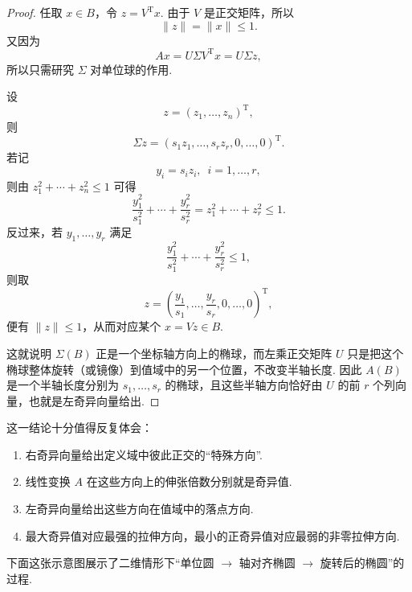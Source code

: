 \begin{proof}
    任取 $ x \in B $，令 $ z = V^{\mathrm{T}}x $. 由于 $ V $ 是正交矩阵，所以
    \[
        \lVert z \rVert = \lVert x \rVert \leqslant 1.
    \]
    又因为
    \[
        Ax = U\Sigma V^{\mathrm{T}}x = U\Sigma z,
    \]
    所以只需研究 $ \Sigma $ 对单位球的作用.

    设
    \[
        z = (z_1, \ldots, z_n)^{\mathrm{T}},
    \]
    则
    \[
        \Sigma z = (s_1z_1, \ldots, s_rz_r, 0, \ldots, 0)^{\mathrm{T}}.
    \]
    若记
    \[
        y_i = s_i z_i,\enspace i = 1, \ldots, r,
    \]
    则由 $ z_1^2 + \cdots + z_n^2 \leqslant 1 $ 可得
    \[
        \frac{y_1^2}{s_1^2} + \cdots + \frac{y_r^2}{s_r^2}
        = z_1^2 + \cdots + z_r^2
        \leqslant 1.
    \]
    反过来，若 $ y_1, \ldots, y_r $ 满足
    \[
        \frac{y_1^2}{s_1^2} + \cdots + \frac{y_r^2}{s_r^2} \leqslant 1,
    \]
    则取
    \[
        z = \left( \frac{y_1}{s_1}, \ldots, \frac{y_r}{s_r}, 0, \ldots, 0 \right)^{\mathrm{T}},
    \]
    便有 $ \lVert z \rVert \leqslant 1 $，从而对应某个 $ x = Vz \in B $.

    这就说明 $ \Sigma(B) $ 正是一个坐标轴方向上的椭球，而左乘正交矩阵 $ U $ 只是把这个椭球整体旋转（或镜像）到值域中的另一个位置，不改变半轴长度. 因此 $ A(B) $ 是一个半轴长度分别为 $ s_1, \ldots, s_r $ 的椭球，且这些半轴方向恰好由 $ U $ 的前 $ r $ 个列向量，也就是左奇异向量给出.
\end{proof}

这一结论十分值得反复体会：
\begin{enumerate}
    \item 右奇异向量给出定义域中彼此正交的“特殊方向”.

    \item 线性变换 $ A $ 在这些方向上的伸张倍数分别就是奇异值.

    \item 左奇异向量给出这些方向在值域中的落点方向.

    \item 最大奇异值对应最强的拉伸方向，最小的正奇异值对应最弱的非零拉伸方向.
\end{enumerate}

下面这张示意图展示了二维情形下“单位圆 $\to$ 轴对齐椭圆 $\to$ 旋转后的椭圆”的过程.


